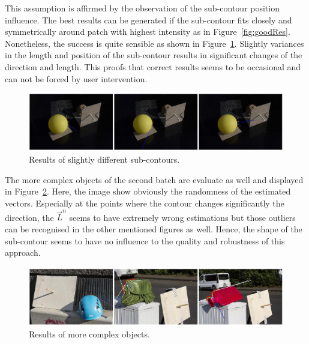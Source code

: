 This assumption is affirmed by the observation of the sub-contour position influence. The best results can be generated if the sub-contour fits closely and symmetrically around patch with highest intensity as in Figure~\ref{fig:goodRes}. Nonetheless, the success is quite sensible as shown in Figure~\ref{fig:subcontourRes}. Slightly variances in the length and position of the sub-contour results in significant changes of the direction and length. This proofs that correct results seems to be occasional and can not be forced by user intervention. 

\begin{figure}[H] 

	\center 
	\includegraphics[width=\linewidth]{Images/Lage_der Subcontour.jpg}
	\caption[Bildunterschrift]{Results of slightly different sub-contours.}	
		\label{fig:subcontourRes}	
\end{figure}

The more complex objects of the second batch are evaluate as well and displayed in Figure~\ref{fig:complexRes}. Here, the image show obviously the randomness of the estimated vectors. Especially at the points where the contour changes significantly the direction, the $\vec{L}^n$ seems to have extremely wrong estimations but those outliers can be recognised in the other mentioned figures as well. Hence, the shape of the sub-contour seems to have no influence to the quality and robustness of this approach.
\begin{figure}[H] 
	
	\center 
	\includegraphics[width=\linewidth]{Images/Komplex_res.jpg}
	\caption[Bildunterschrift]{Results of more complex objects.}	
	\label{fig:complexRes}	
\end{figure}



